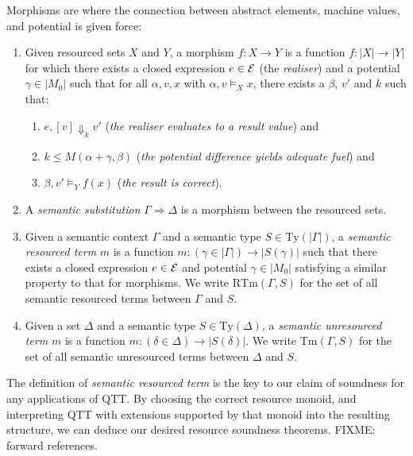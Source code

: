 \documentclass[acmsmall,review]{acmart}
\newcommand{\Ty}{\mathrm{Ty}}
\newcommand{\RTm}{\mathrm{RTm}}
\newcommand{\Tm}{\mathrm{Tm}}
\begin{document}
Morphisms are where the connection between abstract elements, machine
values, and potential is given force:
\begin{definition}
  \label{defn:rl-morphism}
  \begin{enumerate}
  \item Given resourced sets $X$ and $Y$, a morphism $f : X \to Y$ is
    a function $f : |X| \to |Y|$ for which there exists a closed
    expression $e \in \mathcal{E}$ (the \emph{realiser}) and a potential
    $\gamma \in |M_0|$ such that for all $\alpha, v, x$ with
    $\alpha, v \models_X x$, there exists a $\beta$, $v'$ and $k$ such
    that:
    \begin{enumerate}
    \item $e, [v] \Downarrow_k v'$ (\emph{the realiser evaluates to a result value}) and
    \item $k \leq M(\alpha + \gamma, \beta)$ (\emph{the potential difference yields adequate fuel}) and
    \item $\beta, v' \models_Y f(x)$ (\emph{the result is correct}).
    \end{enumerate}
  \item A \emph{semantic substitution} $\Gamma \Rightarrow \Delta$ is
    a morphism between the resourced sets.
  \item Given a semantic context $\Gamma$ and a semantic type
    $S \in \Ty(|\Gamma|)$, a \emph{semantic resourced term} $m$ is a
    function $m : (\gamma \in |\Gamma|) \to |S(\gamma)|$ such that there
    exists a closed expression $e \in \mathcal{E}$ and potential
    $\gamma \in |M_0|$ satisfying a similar property to that for
    morphisms. We write $\RTm(\Gamma, S)$ for the set of all semantic
    resourced terms between $\Gamma$ and $S$.
  \item Given a set $\Delta$ and a semantic type $S \in \Ty(\Delta)$,
    a \emph{semantic unresourced term} $m$ is a function
    $m : (\delta \in \Delta) \to |S(\delta)|$. We write
    $\Tm(\Gamma, S)$ for the set of all semantic unresourced terms
    between $\Delta$ and $S$.
  \end{enumerate}
\end{definition}
The definition of \emph{semantic resourced term} is the key to our
claim of soundness for any applications of QTT. By choosing the
correct resource monoid, and interpreting QTT with extensions
supported by that monoid into the resulting structure, we can deduce
our desired resource soundness theorems. FIXME: forward references.
\end{document}
